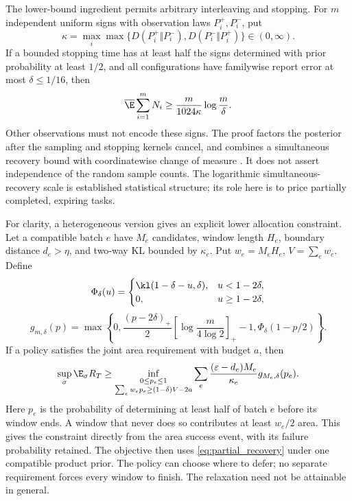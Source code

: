 The lower-bound ingredient permits arbitrary interleaving and stopping. For
$m$ independent uniform signs with observation laws $P_i^+,P_i^-$, put
\[
 \kappa=\max_i\max\{D(P_i^+\Vert P_i^-),D(P_i^-\Vert P_i^+)\}
                                                    \in(0,\infty).
\]
If a bounded stopping time has at least half the signs determined with prior
probability at least $1/2$, and all configurations have familywise report
error at most $\delta\le1/16$, then
\begin{equation}
 \overline\E\sum_{i=1}^mN_i\ge
                 \frac{m}{1024\kappa}\log\frac m\delta.
 \label{eq:partial_recovery}
\end{equation}
Other observations must not encode these signs. The proof factors the posterior
after the sampling and stopping kernels cancel, and combines a simultaneous
recovery bound with coordinatewise change of measure
\citep{kaufmann2016}. It does not assert independence of the random sample
counts. The logarithmic simultaneous-recovery scale is established statistical
structure; its role here is to price partially completed, expiring tasks.

For clarity, a heterogeneous version gives an explicit lower allocation
constraint. Let a compatible batch $e$ have $M_e$ candidates, window length
$H_e$, boundary distance $d_e>\eta$, and two-way KL bounded by $\kappa_e$.
Put $w_e=M_eH_e$, $V=\sum_ew_e$. Define
\[
 \Phi_\delta(u)=
 \begin{cases}\kl(1-\delta-u,\delta),&u<1-2\delta,\\0,&u\ge1-2\delta,
 \end{cases}
\]
\[
 g_{m,\delta}(p)=\max\left\{0,
 \frac{(p-2\delta)_+}{2}\left[\log\frac m{4\log2}\right]_+-1,
 \Phi_\delta(1-p/2)\right\}.
\]
If a policy satisfies the joint area requirement with budget $a$, then
\begin{equation}
 \sup_\sigma\E_\sigma R_T\ge
 \inf_{\substack{0\le p_e\le1\\\sum_ew_ep_e\ge(1-\delta)V-2a}}
 \sum_e\frac{(\varepsilon-d_e)M_e}{\kappa_e}g_{M_e,\delta}(p_e).
 \label{eq:allocation_lower}
\end{equation}
Here $p_e$ is the probability of determining at least half of batch $e$ before
its window ends. A window that never does so contributes at least $w_e/2$
area. This gives the constraint directly from the area success event, with its
failure probability retained. The objective then uses
\eqref{eq:partial_recovery} under one compatible product prior. The policy can
choose where to defer; no separate requirement forces every window to finish.
The relaxation need not be attainable in general.

